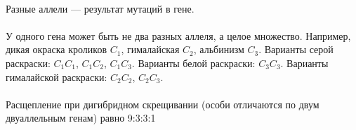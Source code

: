 \documentclass[dvipdfmx]{article}
\begin{document}
\paragraph{}
Разные аллели --- результат мутаций в гене.

\paragraph{}
У одного гена может быть не два разных аллеля, а целое множество.
Например, дикая окраска кроликов $C_1$, гималайская $C_2$, альбинизм $C_3$. Варианты серой раскраски: $C_1C_1$, $C_1C_2$, $C_1C_3$.
Варианты белой раскраски: $C_3C_3$. Варианты гималайской раскраски: $C_2C_2$, $C_2C_3$.

\paragraph{}
Расщепление при дигибридном скрещивании (особи отличаются по двум двуаллельным генам) равно 9:3:3:1
\end{document}
